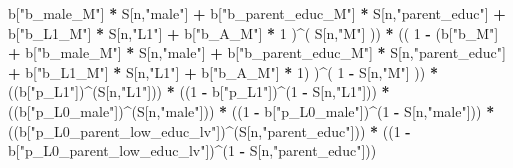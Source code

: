\documentclass[
]{book}
\newenvironment{Shaded}{\begin{snugshade}}{\end{snugshade}}
\newcommand{\DecValTok}[1]{\textcolor[rgb]{0.00,0.00,0.81}{#1}}
\newcommand{\NormalTok}[1]{#1}
\newcommand{\SpecialCharTok}[1]{\textcolor[rgb]{0.81,0.36,0.00}{\textbf{#1}}}
\newcommand{\StringTok}[1]{\textcolor[rgb]{0.31,0.60,0.02}{#1}}
\begin{document}
\begin{Shaded}
\begin{Highlighting}[]
\NormalTok{           b[}\StringTok{"b\_male\_M"}\NormalTok{] }\SpecialCharTok{*}\NormalTok{ S[n,}\StringTok{"male"}\NormalTok{] }\SpecialCharTok{+} 
\NormalTok{           b[}\StringTok{"b\_parent\_educ\_M"}\NormalTok{] }\SpecialCharTok{*}\NormalTok{ S[n,}\StringTok{"parent\_educ"}\NormalTok{] }\SpecialCharTok{+} 
\NormalTok{           b[}\StringTok{"b\_L1\_M"}\NormalTok{] }\SpecialCharTok{*}\NormalTok{ S[n,}\StringTok{"L1"}\NormalTok{] }\SpecialCharTok{+}
\NormalTok{           b[}\StringTok{"b\_A\_M"}\NormalTok{] }\SpecialCharTok{*} \DecValTok{1}\NormalTok{ )}\SpecialCharTok{\^{}}\NormalTok{( S[n,}\StringTok{"M"}\NormalTok{] )) }\SpecialCharTok{*} 
\NormalTok{      (( }\DecValTok{1} \SpecialCharTok{{-}}\NormalTok{ (b[}\StringTok{"b\_M"}\NormalTok{] }\SpecialCharTok{+} 
\NormalTok{                b[}\StringTok{"b\_male\_M"}\NormalTok{] }\SpecialCharTok{*}\NormalTok{ S[n,}\StringTok{"male"}\NormalTok{] }\SpecialCharTok{+} 
\NormalTok{                b[}\StringTok{"b\_parent\_educ\_M"}\NormalTok{] }\SpecialCharTok{*}\NormalTok{ S[n,}\StringTok{"parent\_educ"}\NormalTok{] }\SpecialCharTok{+} 
\NormalTok{                b[}\StringTok{"b\_L1\_M"}\NormalTok{] }\SpecialCharTok{*}\NormalTok{ S[n,}\StringTok{"L1"}\NormalTok{] }\SpecialCharTok{+}
\NormalTok{                b[}\StringTok{"b\_A\_M"}\NormalTok{] }\SpecialCharTok{*} \DecValTok{1}\NormalTok{) )}\SpecialCharTok{\^{}}\NormalTok{( }\DecValTok{1} \SpecialCharTok{{-}}\NormalTok{ S[n,}\StringTok{"M"}\NormalTok{] ))  }\SpecialCharTok{*}
\NormalTok{      ((b[}\StringTok{"p\_L1"}\NormalTok{])}\SpecialCharTok{\^{}}\NormalTok{(S[n,}\StringTok{"L1"}\NormalTok{])) }\SpecialCharTok{*}
\NormalTok{      ((}\DecValTok{1} \SpecialCharTok{{-}}\NormalTok{ b[}\StringTok{"p\_L1"}\NormalTok{])}\SpecialCharTok{\^{}}\NormalTok{(}\DecValTok{1} \SpecialCharTok{{-}}\NormalTok{ S[n,}\StringTok{"L1"}\NormalTok{])) }\SpecialCharTok{*}
\NormalTok{      ((b[}\StringTok{"p\_L0\_male"}\NormalTok{])}\SpecialCharTok{\^{}}\NormalTok{(S[n,}\StringTok{"male"}\NormalTok{])) }\SpecialCharTok{*} 
\NormalTok{      ((}\DecValTok{1} \SpecialCharTok{{-}}\NormalTok{ b[}\StringTok{"p\_L0\_male"}\NormalTok{])}\SpecialCharTok{\^{}}\NormalTok{(}\DecValTok{1} \SpecialCharTok{{-}}\NormalTok{ S[n,}\StringTok{"male"}\NormalTok{])) }\SpecialCharTok{*} 
\NormalTok{      ((b[}\StringTok{"p\_L0\_parent\_low\_educ\_lv"}\NormalTok{])}\SpecialCharTok{\^{}}\NormalTok{(S[n,}\StringTok{"parent\_educ"}\NormalTok{])) }\SpecialCharTok{*}
\NormalTok{      ((}\DecValTok{1} \SpecialCharTok{{-}}\NormalTok{ b[}\StringTok{"p\_L0\_parent\_low\_educ\_lv"}\NormalTok{])}\SpecialCharTok{\^{}}\NormalTok{(}\DecValTok{1} \SpecialCharTok{{-}}\NormalTok{ S[n,}\StringTok{"parent\_educ"}\NormalTok{])) }
    

\end{Highlighting}
\end{Shaded}
\end{document}
